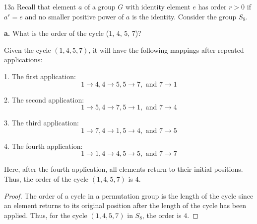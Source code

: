 \documentclass[12pt]{amsart}
\theoremstyle{definition}
\numberwithin{equation}{section}
\theoremstyle{plain}
\begin{document}
\vspace*{20pt}
\begin{exercise}{13a} Recall that element $a$ of a group $G$ with identity element $e$ has order $r > 0$ if $a^r = e$ and no smaller positive power of $a$ is the identity. Consider the group $S_8$.
    
    \textbf{a.} What is the order of the cycle (1, 4, 5, 7)?

    Given the cycle \( (1, 4, 5, 7) \), it will have the following mappings after repeated applications:
    
    1. The first application:
    \[ 1 \to 4, 4 \to 5, 5 \to 7, \text{ and } 7 \to 1 \]
    
    2. The second application:
    \[ 1 \to 5, 4 \to 7, 5 \to 1, \text{ and } 7 \to 4 \]
    
    3. The third application:
    \[ 1 \to 7, 4 \to 1, 5 \to 4, \text{ and } 7 \to 5 \]
    
    4. The fourth application:
    \[ 1 \to 1, 4 \to 4, 5 \to 5, \text{ and } 7 \to 7 \]
    
    Here, after the fourth application, all elements return to their initial positions. Thus, the order of the cycle \( (1, 4, 5, 7) \) is \( 4 \).
    
    \begin{proof}
    The order of a cycle in a permutation group is the length of the cycle since an element returns to its original position after the length of the cycle has been applied. Thus, for the cycle \( (1, 4, 5, 7) \) in \( S_8 \), the order is \( 4 \).
    \end{proof}
\end{exercise}
\vspace*{20pt}
\end{document}
